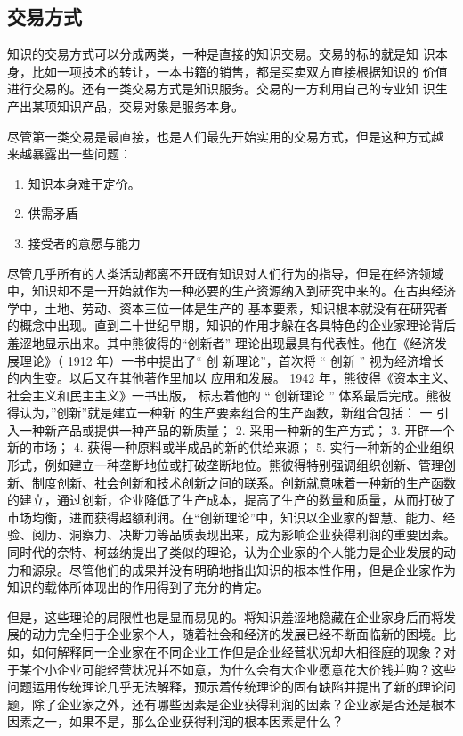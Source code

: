 \documentclass[12pt,a4paper]{ctexart}
\begin{document}
\subsection{交易方式}
知识的交易方式可以分成两类，一种是直接的知识交易。交易的标的就是知
识本身，比如一项技术的转让，一本书籍的销售，都是买卖双方直接根据知识的
价值进行交易的。还有一类交易方式是知识服务。交易的一方利用自己的专业知
识生产出某项知识产品，交易对象是服务本身。

尽管第一类交易是最直接，也是人们最先开始实用的交易方式，但是这种方式越
来越暴露出一些问题：
\begin{enumerate}
\item 知识本身难于定价。
\item 供需矛盾
\item 接受者的意愿与能力
\end{enumerate}



尽管几乎所有的人类活动都离不开既有知识对人们行为的指导，但是在经济领域中，知识却不是一开始就作为一种必要的生产资源纳入到研究中来的。在古典经济学中，土地、劳动、资本三位一体是生产的
基本要素，知识根本就没有在研究者的概念中出现。直到二十世纪早期，知识的作用才躲在各具特色的企业家理论背后羞涩地显示出来。其中熊彼得的“创新者”
理论出现最具有代表性。他在《经济发展理论》（ 1912 年）一书中提出了“ 创
新理论”，首次将 “ 创新 ” 视为经济增长的内生变。以后又在其他著作里加以
应用和发展。 1942 年，熊彼得《资本主义、社会主义和民主主义》一书出版，
标志着他的 “ 创新理论 ” 体系最后完成。熊彼得认为，”创新”就是建立一种新
的生产要素组合的生产函数，新组合包括： 一 引入一种新产品或提供一种产品的新质量； 2. 采用一种新的生产方式； 3. 开辟一个新的市场； 4. 获得一种原料或半成品的新的供给来源； 5. 实行一种新的企业组织形式，例如建立一种垄断地位或打破垄断地位。熊彼得特别强调组织创新、管理创新、制度创新、社会创新和技术创新之间的联系。创新就意味着一种新的生产函数的建立，通过创新，企业降低了生产成本，提高了生产的数量和质量，从而打破了市场均衡，进而获得超额利润。在“创新理论”中，知识以企业家的智慧、能力、经验、阅历、洞察力、决断力等品质表现出来，成为影响企业获得利润的重要因素。同时代的奈特、柯兹纳提出了类似的理论，认为企业家的个人能力是企业发展的动力和源泉。尽管他们的成果并没有明确地指出知识的根本性作用，但是企业家作为知识的载体所体现出的作用得到了充分的肯定。

但是，这些理论的局限性也是显而易见的。将知识羞涩地隐藏在企业家身后而将发展的动力完全归于企业家个人，随着社会和经济的发展已经不断面临新的困境。比如，如何解释同一企业家在不同企业工作但是企业经营状况却大相径庭的现象？对于某个小企业可能经营状况并不如意，为什么会有大企业愿意花大价钱并购？这些问题运用传统理论几乎无法解释，预示着传统理论的固有缺陷并提出了新的理论问题，除了企业家之外，还有哪些因素是企业获得利润的因素？企业家是否还是根本因素之一，如果不是，那么企业获得利润的根本因素是什么？
\end{document}
